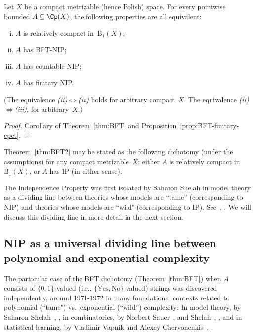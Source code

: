 \begin{theorem}\label{thm:BFT2}
    Let $X$ be a compact metrizable (hence Polish) space.
    For every pointwise bounded $A\subseteq \Cp(X)$, the following properties are all equivalent:
    \begin{enumerate}[(i)]
        \item $A$ is relatively compact in~$\mathrm{B}_1(X)$;
        \item $A$ has BFT-NIP;
        \item $A$ has countable NIP;
        \item $A$ has finitary NIP.
    \end{enumerate}
\end{theorem}

(The equivalence \emph{(ii)}$\Leftrightarrow$\emph{(iv)} holds for arbitrary compact~$X$.
The equivalence \emph{(ii)}$\Leftrightarrow$\emph{(iii)}, for arbitrary~$X$.)

\begin{proof}
    Corollary of Theorem~\ref{thm:BFT} and Proposition~\ref{prop:BFT-finitary-cpct}.
\end{proof}

Theorem~\ref{thm:BFT2} may be stated as the following dichotomy (under the assumptions) for any compact metrizable~$X$:
either $A$ is relatively compact in~$\mathrm{B}_1(X)$, or $A$ has IP (in either sense).

The Independence Property was first isolated by Saharon Shelah in model theory as a dividing line between theories whose models are ``tame'' (corresponding to NIP) and theories whose models are ``wild" (corresponding to IP).
See~\cite[Definition 4.1]{Shelah:1971}, \cite{Shelah:1990}.
We will discuss this dividing line in more detail in the next section.

\subsection{NIP as a universal dividing line between polynomial and exponential complexity}

The particular case of the BFT dichotomy (Theorem~\ref{thm:BFT}) when $A$ consists of $\{0,1\}$-valued (i.e., $\{\text{Yes},\text{No}\}$-valued) strings was discovered independently, around 1971-1972 in many foundational contexts related to polynomial (``tame") vs.\ exponential (``wild'') complexity: In model theory, by Saharon Shelah~\cite{Shelah:1971}, \cite{Shelah:1990}, in combinatorics, by Norbert Sauer~\cite{Sauer:1972}, and Shelah~\cite{Shelah:1972}, \cite{Shelah:1990}, and in statistical learning, by Vladimir Vapnik and Alexey Chervonenkis~\cite{Vapnik-Chervonenkis:1971}, \cite{Vapnik-Chervonenkis:1974}.


